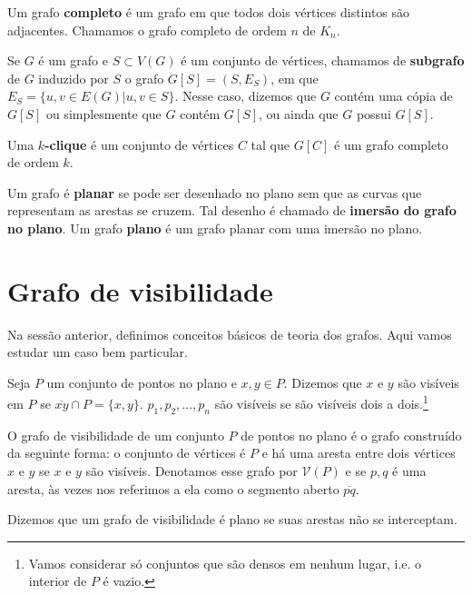 Um grafo \textbf{completo} é um grafo em que todos dois vértices distintos são adjacentes. Chamamos o grafo completo de ordem $n$ de $K_n$.

Se $G$ é um grafo e  $S\subset V(G)$ é um conjunto de vértices, chamamos de \textbf{subgrafo} de $G$ induzido por $S$ o grafo $G[S]=(S,E_S)$, em que $E_S=\{{u,v}\in E(G)|u,v\in S\}$. Nesse caso, dizemos que $G$ contém uma cópia de $G[S]$ ou simplesmente que $G$ contém $G[S]$, ou ainda que $G$ possui $G[S]$.

Uma \textbf{$k$-clique} é um conjunto de vértices $C$ tal que $G[C]$ é um grafo completo de ordem $k$.

Um grafo é \textbf{planar} se pode ser desenhado no plano sem que as curvas que representam as arestas se cruzem. Tal desenho é chamado de \textbf{imersão do grafo no plano}. Um grafo \textbf{plano} é um grafo planar com uma imersão no plano.

\section{Grafo de visibilidade}
Na sessão anterior, definimos conceitos básicos de teoria dos grafos. Aqui vamos estudar um caso bem particular.

Seja $P$ um conjunto de pontos no plano e $x,y\in P$. Dizemos que $x$ e $y$ são visíveis em $P$ se $\overline{xy}\cap P =\{x,y\}$. $p_1, p_2, ..., p_n$ são visíveis se são visíveis dois a dois.\footnote{Vamos considerar só conjuntos que são densos em nenhum lugar, i.e. o interior de $P$ é vazio.}

O grafo de visibilidade de um conjunto $P$ de pontos no plano é o grafo construído da seguinte forma: o conjunto de vértices é $P$ e há uma aresta entre dois vértices $x$ e $y$ se $x$ e $y$ são visíveis. Denotamos esse grafo por $\mathcal V(P)$ e se ${p,q}$ é uma aresta, às vezes nos referimos a ela como o segmento aberto $\overline{pq}$.

Dizemos que um grafo de visibilidade é plano se suas arestas não se interceptam.

